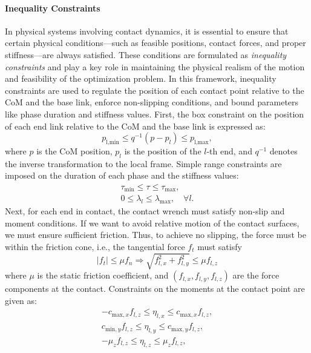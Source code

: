 \documentclass[main.tex]{subfiles}
\begin{document}
\paragraph{Inequality Constraints}
In physical systems involving contact dynamics, it is essential to ensure that certain physical conditions—such as feasible positions, contact forces, and proper stiffness—are always satisfied. These conditions are formulated as \textit{inequality constraints} and play a key role in maintaining the physical realism of the motion and feasibility of the optimization problem.
In this framework, inequality constraints are used to regulate the position of each contact point relative to the CoM and the base link, enforce non-slipping conditions, and bound parameters like phase duration and stiffness values.
First, the box constraint on the position of each end link relative to the CoM and the base link is expressed as:
\begin{equation}
p_{\text{l,min}} \leq q^{-1}(p - p_l) \leq p_{\text{l,max}},
\end{equation}
where $p$ is the CoM position, $p_l$ is the position of the $l$-th end, and $q^{-1}$ denotes the inverse transformation to the local frame.
Simple range constraints are imposed on the duration of each phase and the stiffness values:
\begin{align}
\tau_{\text{min}} \leq \tau \leq \tau_{\text{max}}, \\
0 \leq \lambda_l \leq \lambda_{\text{max}}, \quad \forall l.
\end{align}
Next, for each end in contact, the contact wrench must satisfy non-slip and moment conditions.  
If we want to avoid relative motion of the contact surfaces, we must ensure sufficient friction. Thus, to achieve no slipping, the force must be within the friction cone, i.e., the tangential force $f_t$ must satisfy 
\begin{equation}
    \lvert f_t \rvert \leq \mu f_n  \Longrightarrow \sqrt{f_{l,x}^2 + f_{l,y}^2} \leq \mu f_{l,z}
\end{equation}
where $\mu$ is the static friction coefficient, and $(f_{l,x}, f_{l,y}, f_{l,z})$ are the force components at the contact.
Constraints on the moments at the contact point are given as:
\begin{align}
-c_{\text{max},x} f_{l,z} \leq \eta_{l,x} \leq c_{\text{max},x} f_{l,z}, \\
c_{\text{min},y} f_{l,z} \leq \eta_{l,y} \leq c_{\text{max},y} f_{l,z}, \\
-\mu_z f_{l,z} \leq \eta_{l,z} \leq \mu_z f_{l,z},
\end{align}
\end{document}
